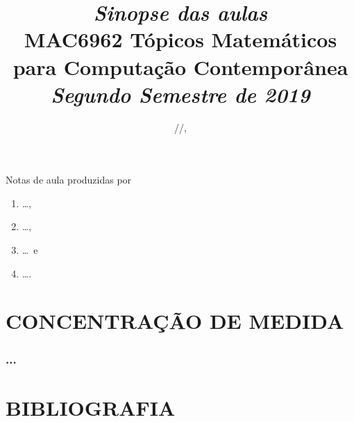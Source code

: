 


\linenumbers

\title[MAC6962 Tópicos Matemáticos para Computação Contemporânea]{%
{\small\sl Sinopse das aulas}\\\bigskip
MAC6962 Tópicos Matemáticos para Computação Contemporânea\\\bigskip
{\it Segundo Semestre de 2019}
}

\address{Instituto de Matemática e Estatística, Universidade de São
  Paulo, Rua do Matão 1010, 05508--090~São Paulo, SP}


\yyyymmdddate
\shortdate
\def\today{\number\year/\number\month/\number\day}
\date{\today, \currenttime}
\footskip=28pt


\maketitle

\section*{}
\label{sec:prefacio}
\doublespace
Notas de aula produzidas por
\begin{enumerate}[label=\nplain]
\item \dots,
\item \dots,
\item \dots\ e
\item \dots.
\end{enumerate}

\endgroup
\newpage\onehalfspace
\tableofcontents
\pagestyle{fancy}

\endgroup
\doublespace

\newpage
\part{CONCENTRAÇÃO DE MEDIDA}

\section{...}
\label{...}




\newpage
\part{BIBLIOGRAFIA}

%


\endgroup


